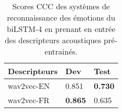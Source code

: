\begin{table}[h]
  \centering
  \begin{tabular}{|l|l|l|}
  \hline
  Descripteurs   &Dev   &Test  \\
  \hline
  wav2vec-EN      &0.851 &\textbf{0.730} \\
  wav2vec-FR      &\textbf{0.865} &0.635 \\
  \hline
\end{tabular}
\caption{Scores CCC des systèmes de reconnaissance des émotions du biLSTM-4 en prenant en entrée des descripteurs acoustiques pré-entrainés.}
\label{tab:res_wav2vec}
\end{table}
